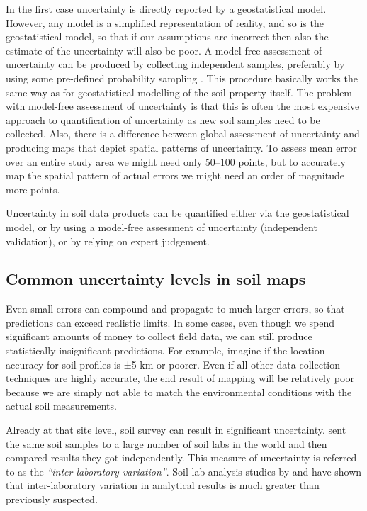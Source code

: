 \documentclass[11pt]{krantz}
\makeatletter
\newenvironment{kframe}{%
\medskip{}
\setlength{\fboxsep}{.8em}
 \def\at@end@of@kframe{}%
 \ifinner\ifhmode%
  \def\at@end@of@kframe{\end{minipage}}%
  \begin{minipage}{\columnwidth}%
 \fi\fi%
 \def\FrameCommand##1{\hskip\@totalleftmargin \hskip-\fboxsep
 \colorbox{shadecolor}{##1}\hskip-\fboxsep
     \hskip-\linewidth \hskip-\@totalleftmargin \hskip\columnwidth}%
 \MakeFramed {\advance\hsize-\width
   \@totalleftmargin\z@ \linewidth\hsize
   \@setminipage}}%
 {\par\unskip\endMakeFramed%
 \at@end@of@kframe}
\newenvironment{rmdblock}[1]
  {
  \begin{itemize}
  \renewcommand{\labelitemi}{
    \raisebox{-.7\height}[0pt][0pt]{
      {\setkeys{Gin}{width=3em,keepaspectratio}\texttt{[image: images/\#1]}}
    }
  }
  \setlength{\fboxsep}{1em}
  \begin{kframe}
  \item
  }
  {
  \end{kframe}
  \end{itemize}
  }
\newenvironment{rmdnote}
  {\begin{rmdblock}{note}}
  {\end{rmdblock}}
\theoremstyle{definition}
\theoremstyle{definition}
\theoremstyle{definition}
\theoremstyle{remark}
\makeatother
\begin{document}
In the first case uncertainty is directly reported by a geostatistical
model. However, any model is a simplified representation of reality, and
so is the geostatistical model, so that if our assumptions are incorrect
then also the estimate of the uncertainty will also be poor. A
model-free assessment of uncertainty can be produced by collecting
independent samples, preferably by using some pre-defined probability
sampling \citep{Brus2011EJSS}. This procedure basically works the same
way as for geostatistical modelling of the soil property itself. The
problem with model-free assessment of uncertainty is that this is often
the most expensive approach to quantification of uncertainty as new soil
samples need to be collected. Also, there is a difference between global
assessment of uncertainty and producing maps that depict spatial
patterns of uncertainty. To assess mean error over an entire study area
we might need only 50--100 points, but to accurately map the spatial
pattern of actual errors we might need an order of magnitude more
points.

\begin{rmdnote}
Uncertainty in soil data products can be quantified either via the
geostatistical model, or by using a model-free assessment of uncertainty
(independent validation), or by relying on expert judgement.
\end{rmdnote}

\hypertarget{common-uncertainty-levels-in-soil-maps}{%
\subsection{Common uncertainty levels in soil
maps}\label{common-uncertainty-levels-in-soil-maps}}

Even small errors can compound and propagate to much larger errors, so
that predictions can exceed realistic limits. In some cases, even though
we spend significant amounts of money to collect field data, we can
still produce statistically insignificant predictions. For example,
imagine if the location accuracy for soil profiles is ±5 km or poorer.
Even if all other data collection techniques are highly accurate, the
end result of mapping will be relatively poor because we are simply not
able to match the environmental conditions with the actual soil
measurements.

Already at that site level, soil survey can result in significant
uncertainty. \citet{Pleijsier1986ISRIC} sent the same soil samples to a
large number of soil labs in the world and then compared results they
got independently. This measure of uncertainty is referred to as the
\emph{``inter-laboratory variation''}. Soil lab analysis studies by
\citet{Pleijsier1986ISRIC} and \citeauthor{vanReeuwijk1982}
\citetext{\citeyear{vanReeuwijk1982}; \citealp{vanReeuwijk1984ISRIC}}
have shown that inter-laboratory variation in analytical results is much
greater than previously suspected.
\end{document}

